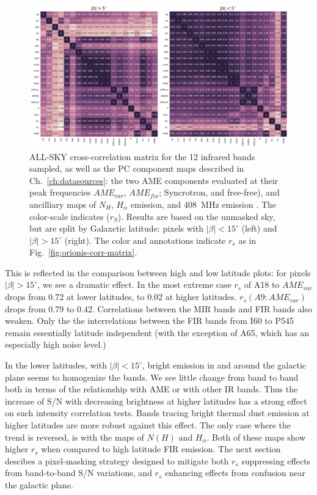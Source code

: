           \begin{figure}
            \includegraphics[width=\textwidth]{../Plots/ch_allsky/all_bands_corr_matrix_wAME_spearmanintensity_unmasked.pdf}
            \centering
            \caption{ALL-SKY cross-correlation matrix for the 12 infrared bands sampled, as well as the PC component maps described in Ch.~\ref{ch:datasources}: the two AME components evaluated at their peak frequencies $AME_{var}$, $AME_{fix}$; Syncrotron, and free-free), and ancilliary maps of $N_{H}$, $H_{\alpha{}}$ emission, and 408~MHz emission \cite{haslam82}. The color-scale indicates ($r_{S}$). Results are based on the unmasked sky, but are split by Galaxctic latitude: pixels with $|\beta{}| < 15^{\circ}$ (left) and $|\beta{}| > 15^{\circ}$ (right). The color and annotations indicate $r_{s}$ as in Fig.~\ref{fig:orionis-corr-matrix}. }
            \label{fig:all_bands_corr_matrix_wAME_spearman}
          \end{figure}
       This is reflected in the comparison between high and low latitude plots: for pixels $|\beta| > 15 ^{\circ}$, we see a dramatic effect. In the most extreme case $r_{s}$ of A18 to $AME_{var}$ drops from 0.72 at lower latitudes, to 0.02 at higher latitudes. $r_{s}(A9:AME_{var})$ drops from 0.79 to 0.42. Correlations between the MIR bands and FIR bands also weaken. Only the the interrelations between the FIR bands from I60 to P545 remain essentially latitude independent (with the exception of A65, which has an especially high noise level.)

        In the lower latitudes, with $|\beta| < 15^{\circ}$, bright emission in and around the galactic plane seems to homogenize the bands. We see little change from band to band both in terms of the relationship with AME or with other IR bands. Thus the increase of S/N with decreasing brightness at higher latitudes has a strong effect on such intensity correlation tests. Bands tracing bright thermal dust emission at higher latitudes are more robust against this effect. The only case where the trend is reversed, is with the maps of $N(H)$ and $H_{\alpha}$. Both of these maps show higher $r_{s}$ when compared to high latitude FIR emission. The next section descibes a pixel-masking strategy designed to mitigate both $r_{s}$ suppressing effects from band-to-band S/N variations, and $r_{s}$ enhancing effects from confusion near the galactic plane.

